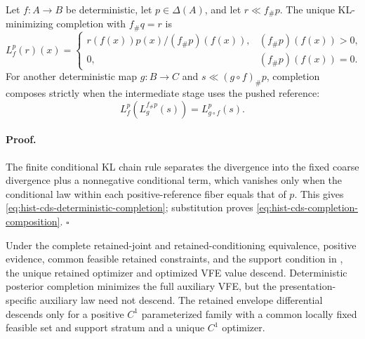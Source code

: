 Let \(f:A\to B\) be deterministic, let \(p\in\Delta(A)\), and let
\(r\ll f_\#p\).  The unique KL-minimizing completion with \(f_\#q=r\) is
\begin{equation}
L_f^p(r)(x)=
\begin{cases}
r(f(x))p(x)/(f_\#p)(f(x)),&(f_\#p)(f(x))>0,\\
0,&(f_\#p)(f(x))=0.
\end{cases}
\label{eq:hist-cds-deterministic-completion}
\end{equation}
For another deterministic map \(g:B\to C\) and
\(s\ll(g\circ f)_\#p\), completion composes strictly when the intermediate
stage uses the pushed reference:
\begin{equation}
L_f^p\!\left(L_g^{f_\#p}(s)\right)=L_{g\circ f}^p(s).
\label{eq:hist-cds-completion-composition}
\end{equation}

\paragraph{Proof.}
The finite conditional KL chain rule separates the divergence into the
fixed coarse divergence plus a nonnegative conditional term, which vanishes
only when the conditional law within each positive-reference fiber equals
that of \(p\).  This gives \eqref{eq:hist-cds-deterministic-completion};
substitution proves \eqref{eq:hist-cds-completion-composition}.  \(\square\)

Under the complete retained-joint and retained-conditioning equivalence,
positive evidence, common feasible retained constraints, and the support
condition in , the unique
retained optimizer and optimized VFE value descend.  Deterministic posterior
completion minimizes the full auxiliary VFE, but the presentation-specific
auxiliary law need not descend.  The retained envelope differential descends
only for a positive \(C^1\) parameterized family with a common locally fixed
feasible set and support stratum and a unique \(C^1\) optimizer.

